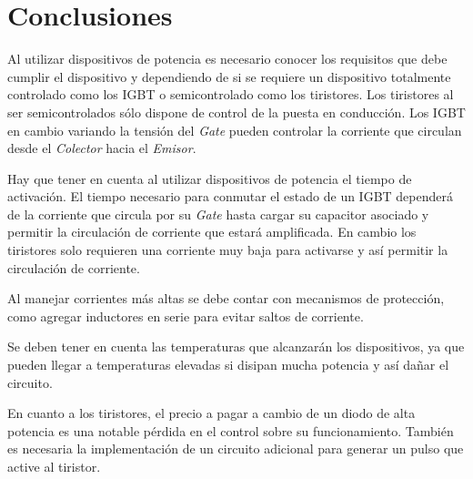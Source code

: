 \documentclass[10pt,spanish,a4paper,openany,notitlepage]{article}
\begin{document}
\section{Conclusiones}

Al utilizar dispositivos de potencia es necesario conocer  los requisitos 
que debe cumplir el dispositivo y dependiendo de si se requiere un dispositivo 
totalmente controlado como los IGBT o semicontrolado como los tiristores. 
Los tiristores al ser semicontrolados sólo dispone de control de la puesta 
en conducción. Los IGBT en cambio variando la tensión del \emph{Gate} pueden 
controlar la corriente que circulan desde el \emph{Colector} hacia el \emph{Emisor}.


Hay que tener en cuenta al utilizar dispositivos de potencia el tiempo de activación.
El tiempo necesario para conmutar el estado de un IGBT dependerá de la 
corriente que circula por su \emph{Gate} hasta cargar su capacitor asociado 
y permitir la circulación de corriente que estará amplificada. En cambio los 
tiristores solo requieren una corriente muy baja para activarse y así permitir 
la circulación de corriente. 


Al manejar corrientes más altas se debe contar con mecanismos de protección, 
como agregar inductores en serie para evitar saltos de corriente. 


Se deben tener en cuenta las temperaturas que alcanzarán los dispositivos, 
ya que pueden llegar a temperaturas elevadas si disipan mucha potencia y 
así dañar el circuito.


En cuanto a los tiristores, el precio a pagar a cambio de un diodo de 
alta potencia es una notable pérdida en el control sobre su funcionamiento. 
También es necesaria la implementación de un circuito adicional para 
generar un pulso que active al tiristor.
\end{document}
